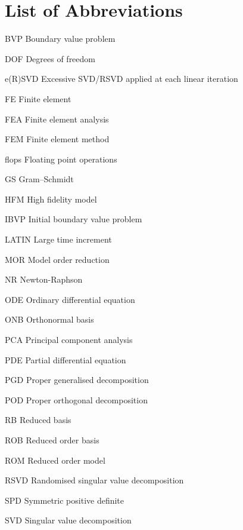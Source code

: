 \chapter*{List of Abbreviations}
\begin{abbrv}
	\item[BVP     ] Boundary value problem
	\item[DOF     ] Degrees of freedom
	\item[e(R)SVD ] Excessive SVD/RSVD applied at each linear iteration
	\item[FE      ] Finite element
	\item[FEA     ] Finite element analysis
	\item[FEM     ] Finite element method
	\item[flops   ] Floating point operations
	\item[GS      ] Gram--Schmidt
	\item[HFM     ] High fidelity model
	\item[IBVP    ] Initial boundary value problem
	\item[LATIN   ] Large time increment
	\item[MOR     ] Model order reduction
	\item[NR      ] Newton-Raphson
	\item[ODE     ] Ordinary differential equation
	\item[ONB     ] Orthonormal basis
	\item[PCA     ] Principal component analysis
	\item[PDE     ] Partial differential equation
	\item[PGD     ] Proper generalised decomposition
	\item[POD     ] Proper orthogonal decomposition
	\item[RB      ] Reduced basis
	\item[ROB     ] Reduced order basis
	\item[ROM     ] Reduced order model
	\item[RSVD    ] Randomised singular value decomposition
	\item[SPD     ] Symmetric positive definite
	\item[SVD     ] Singular value decomposition
\end{abbrv}




